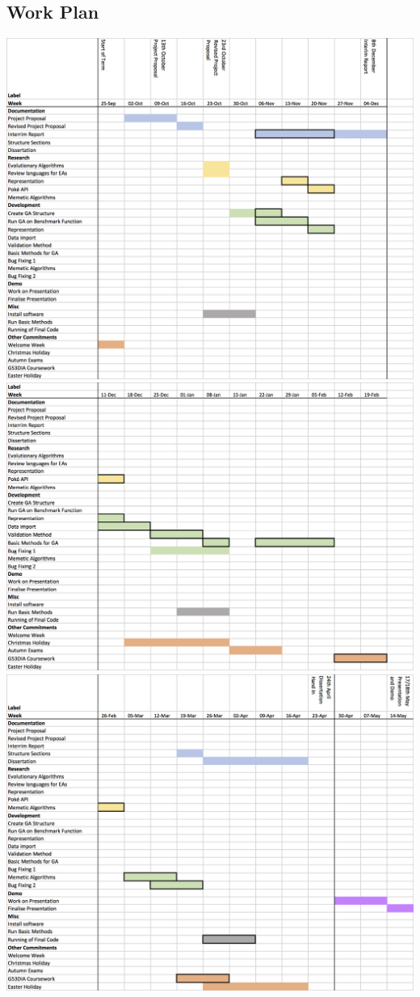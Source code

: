 \documentclass[a4paper]{article}
\begin{document}
\pagebreak
\subsection{Work Plan}
\begin{center}
    \includegraphics[width=15cm]{workPlan-1.png}
	\includegraphics[width=15cm]{workPlan-2.png}
	\includegraphics[width=15cm]{workPlan-3.png}
\end{center}
\end{document}
